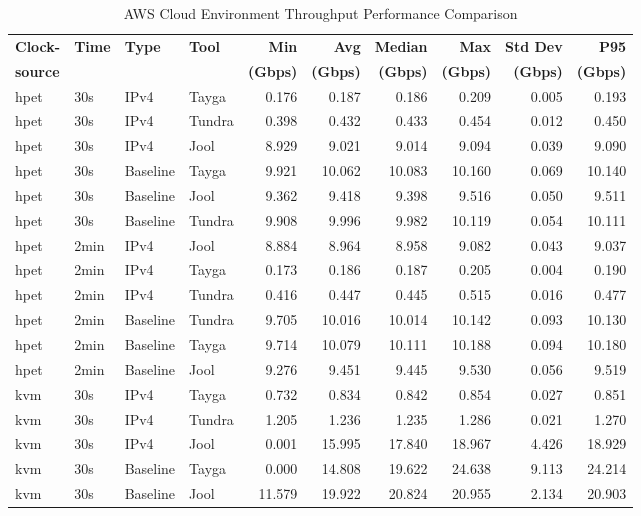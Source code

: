 \begin{table}[htbp]
\centering
\caption{AWS Cloud Environment Throughput Performance Comparison}
\label{tab:throughput_comparison_aws}
\footnotesize
\begin{tabular}{|l|l|l|l|r|r|r|r|r|r|}
\hline
\textbf{Clock-} & \textbf{Time} & \textbf{Type} & \textbf{Tool} & \textbf{Min} & \textbf{Avg} & \textbf{Median} & \textbf{Max} & \textbf{Std Dev} & \textbf{P95} \\
\textbf{source} & & & & \textbf{(Gbps)} & \textbf{(Gbps)} & \textbf{(Gbps)} & \textbf{(Gbps)} & \textbf{(Gbps)} & \textbf{(Gbps)} \\
\hline
hpet & 30s & IPv4 & Tayga & 0.176 & 0.187 & 0.186 & 0.209 & 0.005 & 0.193 \\
hpet & 30s & IPv4 & Tundra & 0.398 & 0.432 & 0.433 & 0.454 & 0.012 & 0.450 \\
hpet & 30s & IPv4 & Jool & 8.929 & 9.021 & 9.014 & 9.094 & 0.039 & 9.090 \\
hpet & 30s & Baseline & Tayga & 9.921 & 10.062 & 10.083 & 10.160 & 0.069 & 10.140 \\
hpet & 30s & Baseline & Jool & 9.362 & 9.418 & 9.398 & 9.516 & 0.050 & 9.511 \\
hpet & 30s & Baseline & Tundra & 9.908 & 9.996 & 9.982 & 10.119 & 0.054 & 10.111 \\
hpet & 2min & IPv4 & Jool & 8.884 & 8.964 & 8.958 & 9.082 & 0.043 & 9.037 \\
hpet & 2min & IPv4 & Tayga & 0.173 & 0.186 & 0.187 & 0.205 & 0.004 & 0.190 \\
hpet & 2min & IPv4 & Tundra & 0.416 & 0.447 & 0.445 & 0.515 & 0.016 & 0.477 \\
hpet & 2min & Baseline & Tundra & 9.705 & 10.016 & 10.014 & 10.142 & 0.093 & 10.130 \\
hpet & 2min & Baseline & Tayga & 9.714 & 10.079 & 10.111 & 10.188 & 0.094 & 10.180 \\
hpet & 2min & Baseline & Jool & 9.276 & 9.451 & 9.445 & 9.530 & 0.056 & 9.519 \\
\hline
kvm & 30s & IPv4 & Tayga & 0.732 & 0.834 & 0.842 & 0.854 & 0.027 & 0.851 \\
kvm & 30s & IPv4 & Tundra & 1.205 & 1.236 & 1.235 & 1.286 & 0.021 & 1.270 \\
kvm & 30s & IPv4 & Jool & 0.001 & 15.995 & 17.840 & 18.967 & 4.426 & 18.929 \\
kvm & 30s & Baseline & Tayga & 0.000 & 14.808 & 19.622 & 24.638 & 9.113 & 24.214 \\
kvm & 30s & Baseline & Jool & 11.579 & 19.922 & 20.824 & 20.955 & 2.134 & 20.903 \\

\end{tabular}
\end{table}
